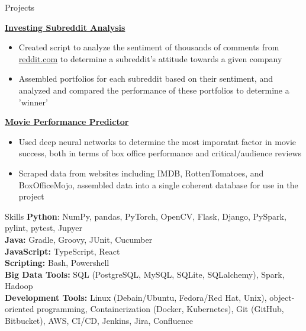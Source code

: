 \documentclass[12pt]{resumeclass}
\begin{document}
\vspace{8pt}
\resumesect
    {Projects}
    {\href{https://github.com/erkearney/investing-subreddit-analysis}{\textbf{Investing
    Subreddit Analysis}}
    \begin{itemize}[noitemsep,nolistsep]
	\item Created script to analyze the sentiment of thousands of comments
	from \href{reddit.com}{reddit.com} to determine a subreddit's attitude towards a given
	company
	\item Assembled portfolios for each subreddit based on their sentiment,
	and analyzed and compared the performance of these portfolios to
	determine a 'winner'
    \end{itemize}

    \vspace{2pt}
    \href{https://github.com/GabrieleMaurina/MoviePerformancePredictor}{\textbf{Movie
    Performance Predictor}}
    {\begin{itemize}[noitemsep,nolistsep]
	\item Used deep neural networks to determine the most imporatnt factor
	in movie success, both in terms of box office performance and
	critical/audience reviews
	\item Scraped data from websites including IMDB, RottenTomatoes, and
	BoxOfficeMojo, assembled data into a single coherent database for use in
	the project
    \end{itemize}}}
\vspace{8pt}
\resumesect
    {Skills}
    {
    \textbf{Python}: NumPy, pandas, PyTorch, OpenCV, Flask, Django, PySpark,
    pylint, pytest, Jupyer\\
    \textbf{Java:} Gradle, Groovy, JUnit, Cucumber\\
    \textbf{JavaScript:} TypeScript, React\\
    \textbf{Scripting:} Bash, Powershell\\
    \textbf{Big Data Tools:} SQL (PostgreSQL, MySQL, SQLite,
    SQLalchemy), Spark, Hadoop\\
    \textbf{Development Tools:} Linux (Debain/Ubuntu, Fedora/Red Hat, Unix),
    object-oriented programming, Containerization (Docker, Kubernetes), Git (GitHub, Bitbucket), AWS, CI/CD, Jenkins, Jira, Confluence}
\end{document}
